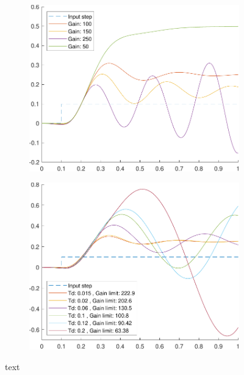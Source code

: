 \begin{figure}
	\begin{subfigure}{0.5\linewidth}
		\centering
		\includegraphics[width=0.9\linewidth]{../code/stretch/figs/gainPlot}
		\caption{}
	\end{subfigure}\hfill
	\begin{subfigure}{0.5\linewidth}
		\centering
		\includegraphics[width=0.9\linewidth]{../code/stretch/figs/TdPlot}
		\caption{}
	\end{subfigure}\hfill
	\caption{text}
\end{figure}

